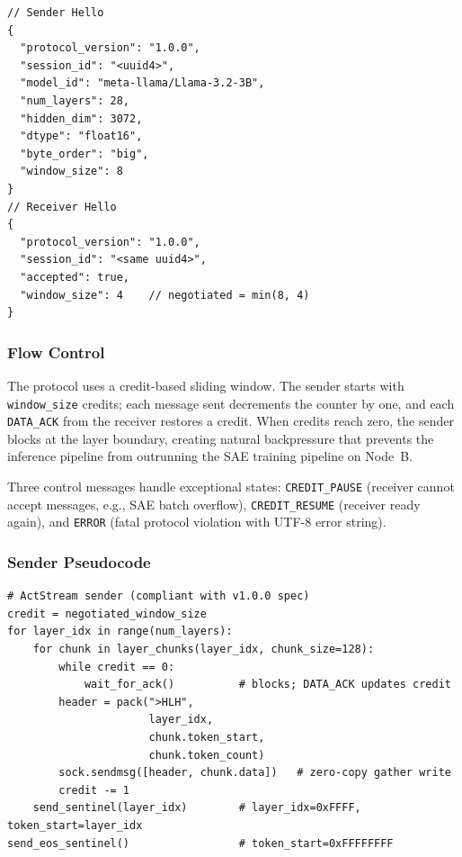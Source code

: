\documentclass[11pt]{article}
\begin{document}
\begin{lstlisting}[style=jsoncode, caption={Session handshake JSON (sender and receiver).}]
// Sender Hello
{
  "protocol_version": "1.0.0",
  "session_id": "<uuid4>",
  "model_id": "meta-llama/Llama-3.2-3B",
  "num_layers": 28,
  "hidden_dim": 3072,
  "dtype": "float16",
  "byte_order": "big",
  "window_size": 8
}
// Receiver Hello
{
  "protocol_version": "1.0.0",
  "session_id": "<same uuid4>",
  "accepted": true,
  "window_size": 4    // negotiated = min(8, 4)
}
\end{lstlisting}

\subsubsection{Flow Control}

The protocol uses a credit-based sliding window. The sender starts with \texttt{window\_size} credits; each message sent decrements the counter by one, and each \texttt{DATA\_ACK} from the receiver restores a credit. When credits reach zero, the sender blocks at the layer boundary, creating natural backpressure that prevents the inference pipeline from outrunning the SAE training pipeline on Node~B.

Three control messages handle exceptional states: \texttt{CREDIT\_PAUSE} (receiver cannot accept messages, e.g., SAE batch overflow), \texttt{CREDIT\_RESUME} (receiver ready again), and \texttt{ERROR} (fatal protocol violation with UTF-8 error string).

\subsubsection{Sender Pseudocode}

\begin{lstlisting}[style=pycode, caption={ActStream sender (compliant with v1.0.0 spec). Nagle algorithm is disabled (TCP\_NODELAY) since the protocol batches header and payload into a single \texttt{sendmsg} call.}]
# ActStream sender (compliant with v1.0.0 spec)
credit = negotiated_window_size
for layer_idx in range(num_layers):
    for chunk in layer_chunks(layer_idx, chunk_size=128):
        while credit == 0:
            wait_for_ack()          # blocks; DATA_ACK updates credit
        header = pack(">HLH",
                      layer_idx,
                      chunk.token_start,
                      chunk.token_count)
        sock.sendmsg([header, chunk.data])   # zero-copy gather write
        credit -= 1
    send_sentinel(layer_idx)        # layer_idx=0xFFFF, token_start=layer_idx
send_eos_sentinel()                 # token_start=0xFFFFFFFF
\end{lstlisting}
\end{document}
